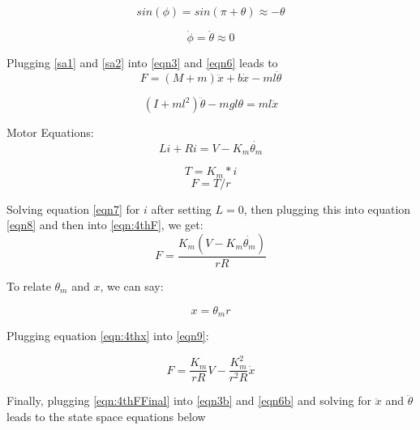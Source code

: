 \documentclass{article}
\begin{document}
\begin{equation} 
\label{sa2}
sin(\phi) = sin(\pi + \theta) \approx -\theta
\end{equation}

\begin{equation} 
\label{sa3}
\dot{\phi} = \dot{\theta} \approx 0
\end{equation}

Plugging \ref{sa1} and \ref{sa2} into \ref{eqn3} and \ref{eqn6} leads to
\begin{equation} 
\label{eqn3b}
F = (M+m)\ddot{x}+b\dot{x} -m l \ddot{\theta}
\end{equation}

\begin{equation} 
\label{eqn6b}
(I+m l^2)\ddot{\theta} - m g l\theta = m l \ddot{x}
\end{equation}

Motor Equations:
\begin{equation} 
\label{eqn7}
L i + R i = V - K_m\dot{\theta_m}
\end{equation}

\begin{equation} 
\label{eqn8}
T = K_m*i
\end{equation}
\begin{equation}
F = T/r
\label{eqn:4thF}
\end{equation}

Solving equation \ref{eqn7} for $i$ after setting $L = 0$, then plugging this into equation \ref{eqn8} and then into \ref{eqn:4thF}, we get:
\begin{equation}
\label{eqn9}
F = \frac{K_m(V - K_m\dot{\theta_m})}{r R}
\end{equation}

To relate $\theta_m$ and $x$, we can say:

\begin{equation}
x = \theta_m r
\label{eqn:4thx}
\end{equation}

Plugging equation \ref{eqn:4thx} into \ref{eqn9}:

\begin{equation}
F = \frac{K_m}{r R} V - \frac{K_m^2}{r^2 R} \dot{x}
\label{eqn:4thFFinal}
\end{equation}

Finally, plugging \ref{eqn:4thFFinal} into \ref{eqn3b} and \ref{eqn6b} and solving for $\ddot{x}$ and $\ddot{\theta}$ leads to the state space equations below
\end{document}
